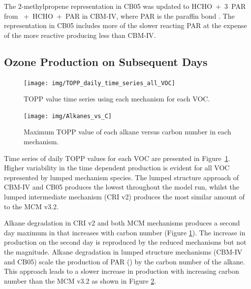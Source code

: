 The $2$-methylpropene representation in CB05 was updated to \mbox{HCHO + $3$ PAR} from \mbox{ + HCHO + PAR} in CBM-IV, where PAR is the paraffin  bond \citep{Gery:1989, Yarwood:2005}.
The representation in CB05 includes more of the slower reacting PAR at the expense of the more reactive  producing less  than CBM-IV.

\subsection{Ozone Production on Subsequent Days} \label{ss:profiles} %

\begin{figure}
    \centering
    \texttt{[image: img/TOPP\_daily\_time\_series\_all\_VOC]}
    \vspace{0mm}
    \caption{TOPP value time series using each mechanism for each VOC.}
    \vspace{-4mm}
    \label{f:TOPP_dailies}
\end{figure}

\begin{figure}
    \centering
    \texttt{[image: img/Alkanes\_vs\_C]}
    \vspace{0mm}
    \caption{Maximum TOPP value of each alkane versus carbon number in each mechanism.}
    \vspace{-4mm}
    \label{f:alkane_TOPP_C}
\end{figure}

Time series of daily TOPP values for each VOC are presented in \mbox{Figure \ref{f:TOPP_dailies}}. 
Higher variability in the time dependent  production is evident for all VOC represented by lumped mechanism species.
The lumped structure approach of CBM-IV and CB05 produces the lowest  throughout the model run, whilst the lumped intermediate mechanism (CRI v2) produces the most similar amount of  to the MCM v3.2.

Alkane degradation in CRI v2 and both MCM mechanisms produces a second day maximum in  that increases with carbon number (Figure \ref{f:TOPP_dailies}).
The increase in  production on the second day is reproduced by the reduced mechanisms but not the magnitude.
Alkane degradation in lumped structure mechanisms (CBM-IV and CB05) scale the  production of PAR () by the carbon number of the alkane.
This approach leads to a slower increase in  production with increasing carbon number than the MCM v3.2 as shown in Figure \ref{f:alkane_TOPP_C}.

